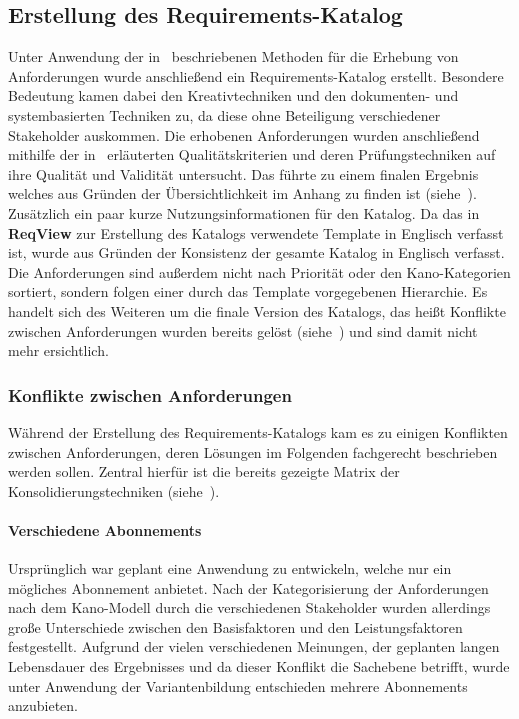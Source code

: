 \subsection{Erstellung des Requirements-Katalog}\label{subsec:requirements}
Unter Anwendung der in~ beschriebenen Methoden für die Erhebung von Anforderungen
wurde anschließend ein Requirements-Katalog erstellt.
Besondere Bedeutung kamen dabei den Kreativtechniken und den dokumenten- und systembasierten Techniken zu, da diese ohne
Beteiligung verschiedener Stakeholder auskommen.
Die erhobenen Anforderungen wurden anschließend mithilfe der in~
erläuterten Qualitätskriterien und deren Prüfungstechniken auf ihre Qualität und Validität untersucht.
Das führte zu einem finalen Ergebnis welches aus Gründen der Übersichtlichkeit im Anhang zu finden ist
(siehe~).
Zusätzlich ein paar kurze Nutzungsinformationen für den Katalog.
Da das in \textbf{ReqView} zur Erstellung des Katalogs verwendete Template in Englisch verfasst ist, wurde aus Gründen
der Konsistenz der gesamte Katalog in Englisch verfasst.
Die Anforderungen sind außerdem nicht nach Priorität oder den Kano-Kategorien sortiert, sondern folgen einer durch das
Template vorgegebenen Hierarchie.
Es handelt sich des Weiteren um die finale Version des Katalogs, das heißt Konflikte zwischen Anforderungen wurden bereits
gelöst (siehe~) und sind damit nicht mehr ersichtlich.

\subsubsection{Konflikte zwischen Anforderungen}\label{subsubsec:conflicts}
Während der Erstellung des Requirements-Katalogs kam es zu einigen Konflikten zwischen Anforderungen, deren Lösungen im Folgenden
fachgerecht beschrieben werden sollen.
Zentral hierfür ist die bereits gezeigte Matrix der Konsolidierungstechniken (siehe~).

\paragraph{Verschiedene Abonnements}
Ursprünglich war geplant eine Anwendung zu entwickeln, welche nur ein mögliches Abonnement anbietet.
Nach der Kategorisierung der Anforderungen nach dem Kano-Modell durch die verschiedenen Stakeholder wurden allerdings
große Unterschiede zwischen den Basisfaktoren und den Leistungsfaktoren festgestellt.
Aufgrund der vielen verschiedenen Meinungen, der geplanten langen Lebensdauer des Ergebnisses und da dieser Konflikt die
Sachebene betrifft, wurde unter Anwendung der Variantenbildung entschieden mehrere Abonnements anzubieten.

